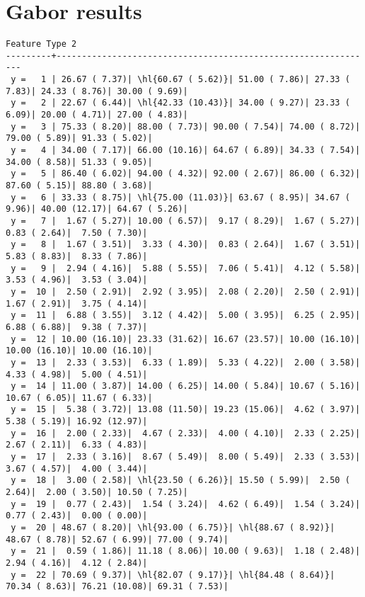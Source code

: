 \documentclass[10pt]{article}
\newcommand{\hl}[1]{\textcolor{blue}{#1}}
\begin{document}
\clearpage
\section*{Gabor results}
\begin{Verbatim}[fontsize=\small, commandchars=\\\{\}]
            Feature Type 2 
---------+---------------------------------------------------------------
 y =   1 | 26.67 ( 7.37)| \hl{60.67 ( 5.62)}| 51.00 ( 7.86)| 27.33 ( 7.83)| 24.33 ( 8.76)| 30.00 ( 9.69)|
 y =   2 | 22.67 ( 6.44)| \hl{42.33 (10.43)}| 34.00 ( 9.27)| 23.33 ( 6.09)| 20.00 ( 4.71)| 27.00 ( 4.83)|
 y =   3 | 75.33 ( 8.20)| 88.00 ( 7.73)| 90.00 ( 7.54)| 74.00 ( 8.72)| 79.00 ( 5.89)| 91.33 ( 5.02)|
 y =   4 | 34.00 ( 7.17)| 66.00 (10.16)| 64.67 ( 6.89)| 34.33 ( 7.54)| 34.00 ( 8.58)| 51.33 ( 9.05)|
 y =   5 | 86.40 ( 6.02)| 94.00 ( 4.32)| 92.00 ( 2.67)| 86.00 ( 6.32)| 87.60 ( 5.15)| 88.80 ( 3.68)|
 y =   6 | 33.33 ( 8.75)| \hl{75.00 (11.03)}| 63.67 ( 8.95)| 34.67 ( 9.96)| 40.00 (12.17)| 64.67 ( 5.26)|
 y =   7 |  1.67 ( 5.27)| 10.00 ( 6.57)|  9.17 ( 8.29)|  1.67 ( 5.27)|  0.83 ( 2.64)|  7.50 ( 7.30)|
 y =   8 |  1.67 ( 3.51)|  3.33 ( 4.30)|  0.83 ( 2.64)|  1.67 ( 3.51)|  5.83 ( 8.83)|  8.33 ( 7.86)|
 y =   9 |  2.94 ( 4.16)|  5.88 ( 5.55)|  7.06 ( 5.41)|  4.12 ( 5.58)|  3.53 ( 4.96)|  3.53 ( 3.04)|
 y =  10 |  2.50 ( 2.91)|  2.92 ( 3.95)|  2.08 ( 2.20)|  2.50 ( 2.91)|  1.67 ( 2.91)|  3.75 ( 4.14)|
 y =  11 |  6.88 ( 3.55)|  3.12 ( 4.42)|  5.00 ( 3.95)|  6.25 ( 2.95)|  6.88 ( 6.88)|  9.38 ( 7.37)|
 y =  12 | 10.00 (16.10)| 23.33 (31.62)| 16.67 (23.57)| 10.00 (16.10)| 10.00 (16.10)| 10.00 (16.10)|
 y =  13 |  2.33 ( 3.53)|  6.33 ( 1.89)|  5.33 ( 4.22)|  2.00 ( 3.58)|  4.33 ( 4.98)|  5.00 ( 4.51)|
 y =  14 | 11.00 ( 3.87)| 14.00 ( 6.25)| 14.00 ( 5.84)| 10.67 ( 5.16)| 10.67 ( 6.05)| 11.67 ( 6.33)|
 y =  15 |  5.38 ( 3.72)| 13.08 (11.50)| 19.23 (15.06)|  4.62 ( 3.97)|  5.38 ( 5.19)| 16.92 (12.97)|
 y =  16 |  2.00 ( 2.33)|  4.67 ( 2.33)|  4.00 ( 4.10)|  2.33 ( 2.25)|  2.67 ( 2.11)|  6.33 ( 4.83)|
 y =  17 |  2.33 ( 3.16)|  8.67 ( 5.49)|  8.00 ( 5.49)|  2.33 ( 3.53)|  3.67 ( 4.57)|  4.00 ( 3.44)|
 y =  18 |  3.00 ( 2.58)| \hl{23.50 ( 6.26)}| 15.50 ( 5.99)|  2.50 ( 2.64)|  2.00 ( 3.50)| 10.50 ( 7.25)|
 y =  19 |  0.77 ( 2.43)|  1.54 ( 3.24)|  4.62 ( 6.49)|  1.54 ( 3.24)|  0.77 ( 2.43)|  0.00 ( 0.00)|
 y =  20 | 48.67 ( 8.20)| \hl{93.00 ( 6.75)}| \hl{88.67 ( 8.92)}| 48.67 ( 8.78)| 52.67 ( 6.99)| 77.00 ( 9.74)|
 y =  21 |  0.59 ( 1.86)| 11.18 ( 8.06)| 10.00 ( 9.63)|  1.18 ( 2.48)|  2.94 ( 4.16)|  4.12 ( 2.84)|
 y =  22 | 70.69 ( 9.37)| \hl{82.07 ( 9.17)}| \hl{84.48 ( 8.64)}| 70.34 ( 8.63)| 76.21 (10.08)| 69.31 ( 7.53)|

\end{Verbatim}
\end{document}
